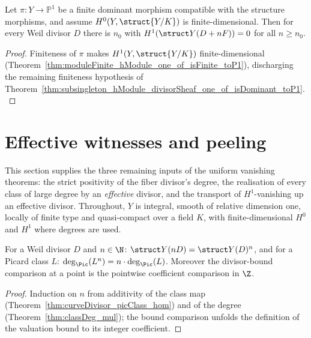 \begin{theorem}
  \label{thm:subsingleton_hModule_divisorSheaf_one_of_isFinite_toP1}
  \leanok
  Let \(\pi \colon Y \to \mathbb P^1\) be a finite dominant morphism compatible with the structure
  morphisms, and assume \(H^0(Y, \struct{Y/K})\) is finite-dimensional. Then for every Weil divisor
  \(D\) there is \(n_0\) with \(H^1(\struct Y(D + nF)) = 0\) for all \(n \ge n_0\).
\end{theorem}
\begin{proof}
  \leanok
  Finiteness of \(\pi\) makes \(H^1(Y, \struct{Y/K})\) finite-dimensional
  (Theorem~\ref{thm:moduleFinite_hModule_one_of_isFinite_toP1}), discharging the remaining
  finiteness hypothesis of Theorem~\ref{thm:subsingleton_hModule_divisorSheaf_one_of_isDominant_toP1}.
\end{proof}

\section{Effective witnesses and peeling}
\label{sec:effective_peeling}

This section supplies the three remaining inputs of the uniform vanishing theorems: the
strict positivity of the fiber divisor's degree, the realisation of every class of large
degree by an \emph{effective} divisor, and the transport of \(H^1\)-vanishing up an
effective divisor. Throughout, \(Y\) is integral, smooth of relative dimension one, locally
of finite type and quasi-compact over a field \(K\), with finite-dimensional \(H^0\) and
\(H^1\) where degrees are used.

\begin{lemma}
  \label{lem:picClass_nsmul}
  \leanok
  For a Weil divisor \(D\) and \(n \in \N\): \(\struct Y(n D) = \struct Y(D)^{n}\), and for
  a Picard class \(L\): \(\deg_{\Pic}(L^{n}) = n \cdot \deg_{\Pic}(L)\). Moreover the
  divisor-bound comparison at a point is the pointwise coefficient comparison in \(\Z\).
\end{lemma}
\begin{proof}
  \leanok
  Induction on \(n\) from additivity of the class map
  (Theorem~\ref{thm:curveDivisor_picClass_hom}) and of the degree
  (Theorem~\ref{thm:classDeg_mul}); the bound comparison unfolds the definition of the
  valuation bound to its integer coefficient.
\end{proof}

